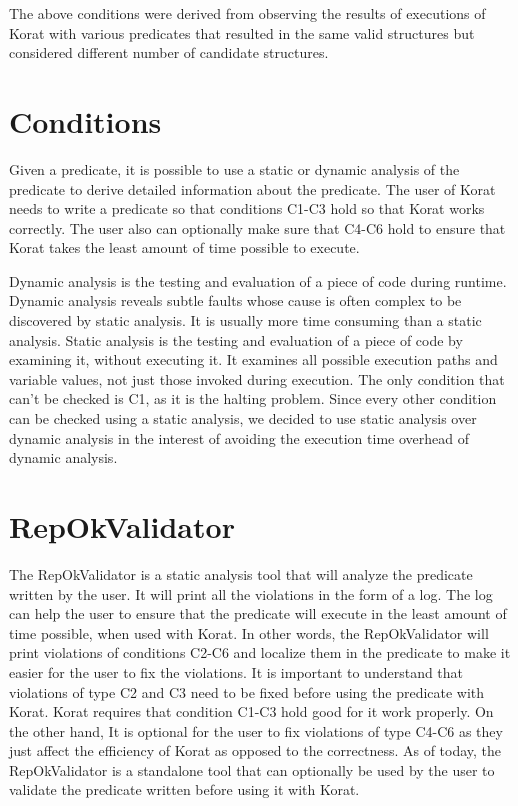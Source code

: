 \par
The above conditions were derived from observing the results of executions of Korat with various predicates that resulted in the same valid structures but considered different number of candidate structures.

\section{Conditions}
Given a predicate, it is possible to use a static or dynamic analysis of the predicate to derive detailed information about the predicate. The user of Korat needs to write a predicate so that conditions C1-C3 hold so that Korat works correctly. The user also can optionally make sure that C4-C6 hold to ensure that Korat takes the least amount of time possible to execute. 

\par
Dynamic analysis is the testing and evaluation of a piece of code during runtime. Dynamic analysis reveals subtle faults whose cause is often complex to be discovered by static analysis. It is usually more time consuming than a static analysis. Static analysis is the testing and evaluation of a piece of code by examining it, without executing it. It examines all possible execution paths and variable values, not just those invoked during execution. The only condition that can’t be checked is C1, as it is the halting problem. Since every other condition can be checked using a static analysis, we decided to use static analysis over dynamic analysis in the interest of avoiding the execution time overhead of dynamic analysis.

\section{RepOkValidator}
The RepOkValidator is a static analysis tool that will analyze the predicate written by the user. It will print all the violations in the form of a log. The log can help the user to ensure that the predicate will execute in the least amount of time possible, when used with Korat. In other words, the RepOkValidator will print violations of conditions C2-C6 and localize them in the predicate to make it easier for the user to fix the violations. It is important to understand that violations of type C2 and C3 need to be fixed before using the predicate with Korat. Korat requires that condition C1-C3 hold good for it work properly. On the other hand, It is optional for the user to fix violations of type C4-C6 as they just affect the efficiency of Korat as opposed to the correctness. As of today, the RepOkValidator is a standalone tool that can optionally be used by the user to validate the predicate written before using it with Korat.

